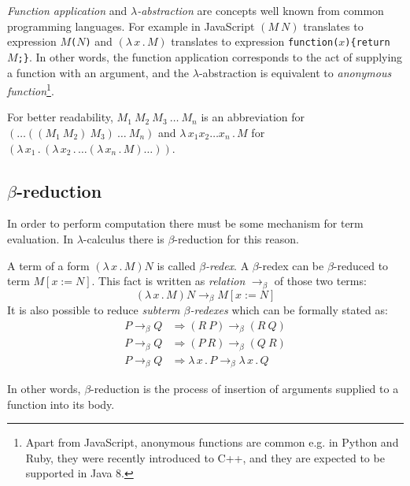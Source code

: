 \documentclass{sig-alternate}
\newcommand{\then}{\Rightarrow\xspace}
\newcommand{\lamb}[2]{( \lambda \, #1 \, . \, #2 )}
\newcommand{\lam}[2]{\lambda \, #1 \, . \, #2}
\begin{document}
\textit{Function application} and 
\textit{$\lambda$-abstraction} are concepts
well known from common programming languages. 
For example in JavaScript 
$(M~N)$ translates to expression \texttt{$M$($N$)} and
$\lamb{x}{M}$ translates to expression \texttt{function($x$)\{return $M$;\}}.
In other words, the function application 
corresponds to the act of supplying a function 
with an argument, and
the $\lambda$-abstraction is equivalent to 
\textit{anonymous function}\footnote{Apart from JavaScript, anonymous functions are common e.g. in Python and Ruby, 
they were recently introduced to C++, and they are expected to be supported in Java 8.}.

For better readability, 
$M_1~M_2~M_3~\dots~M_n$ is an abbreviation for
$(\dots((M_1~M_2)~M_3)~\dots~M_n)$
and $\lam{x_1 x_2 \dots x_n }{M}$ for 
$\lamb{x_1}{\lamb{x_2}{\dots\lamb{x_n}{M}\dots}}$.


\subsection{$\beta$-reduction}

In order to perform computation there must be some
mechanism for term evaluation. In $\lambda$-calculus there
is $\beta$-reduction for this reason.\\

\newcommand{\bRedex}{$\beta$-redex\xspace}
\newcommand{\bRedexes}{$\beta$-redexes\xspace}
\newcommand{\bArrow}{\rightarrow_\beta\xspace}
\newcommand{\eArrow}{\rightarrow_\eta\xspace}
\newcommand{\eeArrow}{\rightarrow_{\eta^{-1}}\xspace}

A term of a form $\lamb{x}{M}N$ is called \textit{\bRedex}.
A \bRedex can be $\beta$-reduced to term $M[x:=N]$. 
This fact is written as \textit{relation} $\bArrow$ 
of those two terms:
\begin{equation} \label{eq:bRed}
\lamb{x}{M}N \bArrow M[x:=N]
\end{equation}
It is also possible to reduce \textit{subterm \bRedexes} 
which can be formally stated as:
\begin{align*}
P \bArrow Q &\then (R~P)      \bArrow (R~Q) \\
P \bArrow Q &\then (P~R)      \bArrow (Q~R) \\
P \bArrow Q &\then \lam{x}{P} \bArrow \lam{x}{Q}  
\end{align*}

In other words, $\beta$-reduction is the process 
of insertion of arguments supplied to a function into 
its body. \\
\end{document}
